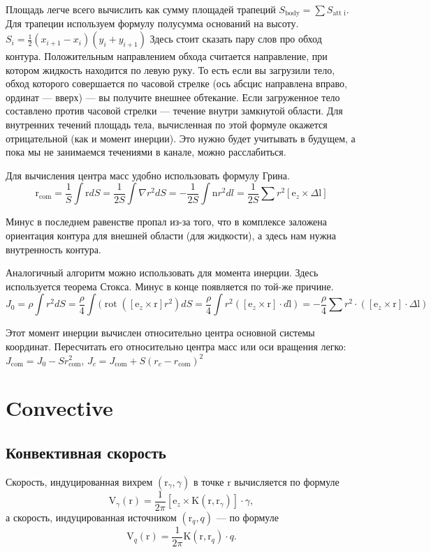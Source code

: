 \documentclass[14pt]{extreport}
\newcommand{\br}[1]{\boldsymbol{\mathrm{#1}}}
\renewcommand{\vec}[1]{\br{#1}}
\DeclareMathOperator{\rot}{rot}
\begin{document}
Площадь легче всего вычислить как сумму площадей трапеций $S_\text{body} = \sum S_\text{att~i}$. Для трапеции используем формулу полусумма оснований на высоту. $S_i = \frac{1}{2}(x_{i+1}-x_i)(y_i+y_{i+1})$
Здесь стоит сказать пару слов про обход контура. Положительным направлением обхода считается направление, при котором жидкость находится по левую руку. То есть если вы загрузили тело, обход которого совершается по часовой стрелке (ось абсцис направлена вправо, ординат --- вверх) --- вы получите внешнее обтекание. Если загруженное тело составлено против часовой стрелки --- течение внутри замкнутой области. Для внутренних течений площадь тела, вычисленная по этой формуле окажется отрицательной (как и момент инерции). Это нужно будет учитывать в будущем, а пока мы не занимаемся течениями в канале, можно расслабиться.

Для вычисления центра масс удобно использовать формулу Грина.
\begin{equation*}
\br r_\text{com} = \dfrac{1}{S}\int \br r dS = \dfrac{1}{2S}\int\nabla r^2 dS = -\dfrac{1}{2S}\int \br n r^2 dl = \dfrac{1}{2S} \sum r^2 [\br e_z \times \Delta \br l]
\end{equation*}

Минус в последнем равенстве пропал из-за того, что в комплексе заложена ориентация контура для внешней области (для жидкости), а здесь нам нужна внутренность контура.

Аналогичный алгоритм можно использовать для момента инерции. Здесь используется теорема Стокса. Минус в конце появляется по той-же причине.
\begin{equation*}
J_0 = \rho \int r^2 dS = \dfrac{\rho}{4}\int(\rot([\br e_z \times \br r] r^2) dS = \dfrac{\rho}{4}\int r^2 ([\br e_z \times \br r] \cdot d \br l) = -\dfrac{\rho}{4} \sum r^2 \cdot ([\br e_z \times \br r] \cdot \Delta \br l)
\end{equation*}

Этот момент инерции вычислен относительно центра основной системы координат. Пересчитать его относительно центра масс или оси вращения легко: $J_\text{com} = J_0 - S r_\text{com}^2$, $J_c = J_\text{com} + S (r_c - r_\text{com})^2$

\section{Convective}
\subsection{Конвективная скорость}
Скорость, индуцированная вихрем $(\vec r_\gamma, \gamma)$ в точке $\vec r$
вычисляется по формуле
\begin{equation}
\label{eq_VortexConvective}
\vec V_\gamma(\vec r) = \frac{1}{2\pi} [\vec e_z \times \vec K(\vec r, \vec r_\gamma)] \cdot \gamma,
\end{equation}
а скорость, индуцированная источником $(\vec r_q, q)$ --- по формуле
\begin{equation}
\label{eq_SourceInfluence}
\vec V_q(\vec r) = \frac{1}{2\pi} \vec K(\vec r, \vec r_q) \cdot q.
\end{equation}
\end{document}
